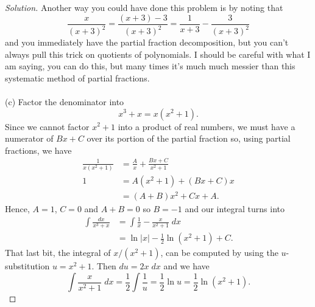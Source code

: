 \documentclass[12pt]{article}
\theoremstyle{plain}
\theoremstyle{definition}
\theoremstyle{remark}
\begin{document}
\begin{proof}[Solution]
Another way you could have done this problem is by noting that
\[
\frac{x}{(x+3)^2}=\frac{(x+3)-3}{(x+3)^2}=\frac{1}{x+3}-\frac{3}{(x+3)^2}
\]
and you immediately have the partial fraction decomposition, but you can't
always pull this trick on quotients of polynomials. I should be careful
with what I am saying, you can do this, but many times it's much much
messier than this systematic method of partial fractions.
\\\\
(c) Factor the denominator into
\begin{equation}
\label{eq:factor-denom-c}
x^3+x=x(x^2+1).
\end{equation}
Since we cannot factor $x^2+1$ into a product of real numbers, we must have
a numerator of $Bx+C$ over its portion of the partial fraction so, using
partial fractions, we have
\begin{align*}
\frac{1}{x(x^2+1)}&=\frac{A}{x}+\frac{Bx+C}{x^2+1}\\
1&=A(x^2+1)+(Bx+C)x\\
&=(A+B)x^2+Cx+A.
\end{align*}
Hence, $A=1$, $C=0$ and $A+B=0$ so $B=-1$ and our integral turns into
\begin{align*}
\int\frac{dx}{x^3+x}
&=\int\frac{1}{x}-\frac{x}{x^2+1}\;dx\\
&=\boxed{\ln|x|-\frac{1}{2}\ln\left(x^2+1\right)+C.}
\end{align*}
That last bit, the integral of $x/(x^2+1)$, can be computed by using the
$u$-substitution $u=x^2+1$. Then $du=2x\;dx$ and we have
\[
\int\frac{x}{x^2+1}\;dx=\frac{1}{2}\int\frac{1}{u}=\frac{1}{2}\ln
u=\frac{1}{2}\ln\left(x^2+1\right).
\]
\end{proof}
\end{document}
